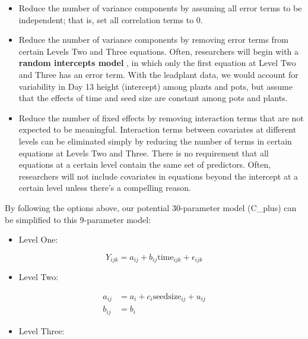\documentclass[
]{krantz}
\providecommand{\tightlist}{%
  \setlength{\itemsep}{0pt}\setlength{\parskip}{0pt}}
\begin{document}
\begin{itemize}
\tightlist
\item
  Reduce the number of variance components by assuming all error terms to be independent; that is, set all correlation terms to 0.
\item
  Reduce the number of variance components by removing error terms from certain Levels Two and Three equations. Often, researchers will begin with a \textbf{random intercepts model} , in which only the first equation at Level Two and Three has an error term. With the leadplant data, we would account for variability in Day 13 height (intercept) among plants and pots, but assume that the effects of time and seed size are constant among pots and plants.
\item
  Reduce the number of fixed effects by removing interaction terms that are not expected to be meaningful. Interaction terms between covariates at different levels can be eliminated simply by reducing the number of terms in certain equations at Levels Two and Three. There is no requirement that all equations at a certain level contain the same set of predictors. Often, researchers will not include covariates in equations beyond the intercept at a certain level unless there's a compelling reason.
\end{itemize}

By following the options above, our potential 30-parameter model (C\_plus) can be simplified to this 9-parameter model:

\begin{itemize}
\tightlist
\item
  Level One:
\end{itemize}

\begin{equation*}
Y_{ijk} = a_{ij}+b_{ij}\textrm{time}_{ijk}+\epsilon_{ijk}
\end{equation*}

\begin{itemize}
\tightlist
\item
  Level Two:
\end{itemize}

\begin{align*}
a_{ij} & = a_{i}+c_{i}\textrm{seedsize}_{ij}+u_{ij} \\
b_{ij} & = b_{i}
\end{align*}

\begin{itemize}
\tightlist
\item
  Level Three:
\end{itemize}
\end{document}
